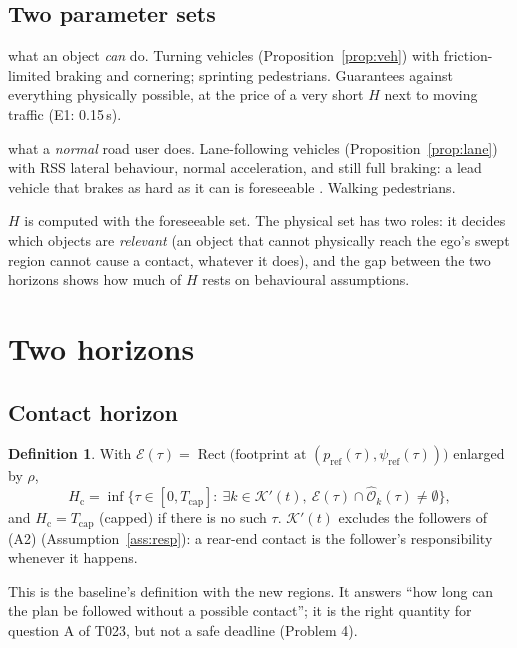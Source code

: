 \documentclass[11pt]{article}
\theoremstyle{definition}
\newtheorem{definition}{Definition}
\theoremstyle{remark}
\newcommand{\Ohat}{\widehat{\mathcal{O}}}
\newcommand{\Ego}{\mathcal{E}}
\newcommand{\Hc}{H_{\mathrm{c}}}
\newcommand{\Tcap}{T_{\mathrm{cap}}}
\newcommand{\pref}{p_{\mathrm{ref}}}
\newcommand{\psiref}{\psi_{\mathrm{ref}}}
\DeclareMathOperator{\Rect}{Rect}
\begin{document}
\subsection{Two parameter sets}\label{sec:sets}
\begin{description}[leftmargin=*]
  \item[Physical:] what an object \emph{can} do. Turning vehicles (Proposition~\ref{prop:veh}) with
    friction-limited braking and cornering; sprinting pedestrians. Guarantees against everything
    physically possible, at the price of a very short $H$ next to moving traffic (E1: 0.15\,s).
  \item[Foreseeable:] what a \emph{normal} road user does. Lane-following vehicles
    (Proposition~\ref{prop:lane}) with RSS lateral behaviour, normal acceleration, and still full braking:
    a lead vehicle that brakes as hard as it can is foreseeable \cite{unr157}. Walking pedestrians.
\end{description}
$H$ is computed with the foreseeable set. The physical set has two roles: it decides which objects are
\emph{relevant} (an object that cannot physically reach the ego's swept region cannot cause a contact,
whatever it does), and the gap between the two horizons shows how much of $H$ rests on behavioural
assumptions.

\section{Two horizons}\label{sec:horizons}

\subsection{Contact horizon}
\begin{definition}
With $\Ego(\tau)=\Rect\big(\text{footprint at }(\pref(\tau),\psiref(\tau))\big)$ enlarged by $\rho$,
\[
\Hc=\inf\Big\{\tau\in[0,\Tcap]:\ \exists k\in\mathcal K'(t),\ \Ego(\tau)\cap\Ohat_k(\tau)\ne\emptyset\Big\},
\]
and $\Hc=\Tcap$ (capped) if there is no such $\tau$. $\mathcal K'(t)$ excludes the followers of (A2)
(Assumption~\ref{ass:resp}): a rear-end contact is the follower's responsibility whenever it happens.
\end{definition}
This is the baseline's definition with the new regions. It answers ``how long can the plan be followed
without a possible contact''; it is the right quantity for question A of T023, but not a safe deadline
(Problem 4).
\end{document}
